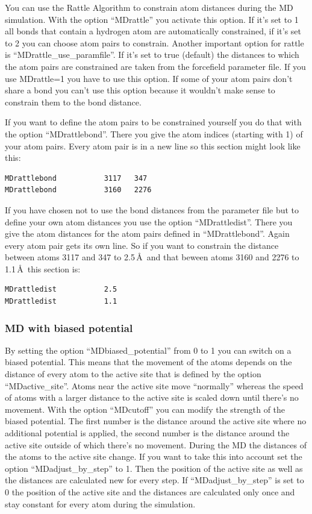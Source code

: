 \documentclass[10pt,a4paper]{article} %
\begin{document}
You can use the Rattle Algorithm\supercite{rattle} to constrain atom distances during the MD simulation. With the option ``MDrattle'' you activate this option. If it's set to 1 all bonds that contain a hydrogen atom are automatically constrained, if it's set to 2 you can choose atom pairs to constrain. Another important option for rattle is ``MDrattle\_use\_paramfile''. If it's set to true (default) the distances to which the atom pairs are constrained are taken from the forcefield parameter file. If you use MDrattle=1 you have to use this option. If some of your atom pairs don't share a bond you can't use this option because it wouldn't make sense to constrain them to the bond distance. 

If you want to define the atom pairs to be constrained yourself you do that with the option ``MDrattlebond''. There you give the atom indices (starting with 1) of your atom pairs. Every atom pair is in a new line so this section might look like this:
\begin{lstlisting}
MDrattlebond           3117   347
MDrattlebond           3160   2276
\end{lstlisting}

If you have chosen not to use the bond distances from the parameter file but to define your own atom distances you use the option ``MDrattledist''. There you give the atom distances for the atom pairs defined in ``MDrattlebond''. Again every atom pair gets its own line. So if you want to constrain the distance between atoms 3117 and 347 to 2.5\,\AA~and that beween atoms 3160 and 2276 to 1.1\,\AA~this section is:
\begin{lstlisting}
MDrattledist           2.5
MDrattledist           1.1
\end{lstlisting}
		
	\subsubsection{MD with biased potential}
	
	By setting the option ``MDbiased\_potential'' from 0 to 1 you can switch on a biased potential. This means that the movement of the atoms depends on the distance of every atom to the active site that is defined by the option ``MDactive\_site''. Atoms near the active site move ``normally'' whereas the speed of atoms with a larger distance to the active site is scaled down until there's no movement. With the option ``MDcutoff'' you can modify the strength of the biased potential. The first number is the distance around the active site where no additional potential is applied, the second number is the distance around the active site outside of which there's no movement. During the MD the distances of the atoms to the active site change. If you want to take this into account set the option ``MDadjust\_by\_step'' to 1. Then the position of the active site as well as the distances are calculated new for every step. If ``MDadjust\_by\_step'' is set to 0 the position of the active site and the distances are calculated only once and stay constant for every atom during the simulation. 
	
\end{document}
